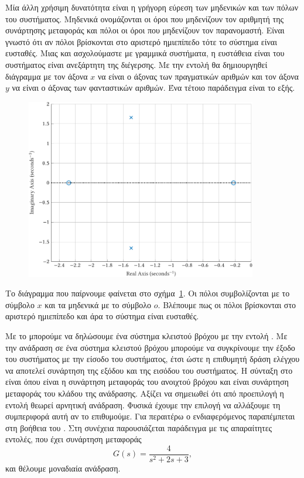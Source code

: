 Μία άλλη χρήσιμη δυνατότητα είναι η γρήγορη εύρεση των μηδενικών και των πόλων
του συστήματος. Μηδενικά ονομάζονται οι όροι που μηδενίζουν τον αριθμητή της
συνάρτησης μεταφοράς και πόλοι οι όροι που μηδενίζουν τον παρανομαστή. Είναι
γνωστό ότι αν πόλοι βρίσκονται στο αριστερό ημιεπίπεδο τότε το σύστημα είναι
ευσταθές. Μιας και ασχολούμαστε με γραμμικά συστήματα, η ευστάθεια είναι
του συστήματος είναι ανεξάρτητη της διέγερσης. Με την εντολή 
θα δημιουργηθεί διάγραμμα με τον άξονα \( x \) να είναι ο άξονας των
πραγματικών αριθμών και τον άξονα \( y \) να είναι ο άξονας των φανταστικών
αριθμών. Ένα τέτοιο παράδειγμα είναι το εξής.
\eng{}
\begin{figure}[h]
    \centering
    \includegraphics[width=0.9\textwidth]{figures/prelim2.pdf}
    \label{fig:prelim2}
\end{figure}
Το διάγραμμα που παίρνουμε φαίνεται στο σχήμα~\ref{fig:prelim2}. Οι πόλοι
συμβολίζονται με το σύμβολο \( x \) και τα μηδενικά με το σύμβολο \( o \).
Βλέπουμε πως οι πόλοι βρίσκονται στο αριστερό ημιεπίπεδο και άρα το σύστημα είναι ευσταθές.

Με το  μπορούμε να δηλώσουμε ένα σύστημα κλειστού βρόχου με την
εντολή . Με την ανάδραση σε ένα σύστημα κλειστού βρόχου μπορούμε
να συγκρίνουμε την έξοδο του συστήματος με την είσοδο του συστήματος, έτσι ώστε
η επιθυμητή δράση ελέγχου να αποτελεί συνάρτηση της εξόδου και της εισόδου του
συστήματος. Η σύνταξη στο  είναι
όπου  είναι η συνάρτηση μεταφοράς του ανοιχτού βρόχου και 
είναι συνάρτηση μεταφοράς του κλάδου της ανάδρασης. Αξίζει να σημειωθεί ότι από
προεπιλογή η εντολή  θεωρεί αρνητική ανάδραση. Φυσικά έχουμε την
επιλογή να αλλάξουμε τη συμπεριφορά αυτή αν το επιθυμούμε. Για περαιτέρω ο
ενδιαφερόμενος παραπέμπεται στη βοήθεια του . Στη συνέχεια
παρουσιάζεται παράδειγμα με τις απαραίτητες εντολές, που έχει συνάρτηση μεταφοράς
\[
    G(s) = \frac{4}{s^2 + 2s + 3},
\]
και θέλουμε μοναδιαία ανάδραση.
\eng{}

